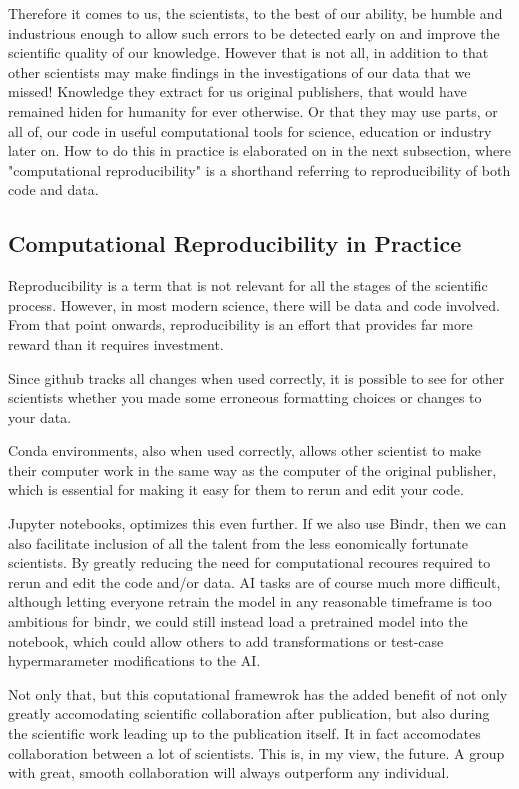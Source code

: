\documentclass[nofootinbib,UKenglish,nobalancelastpage,12pt]{article}
\begin{document}
Therefore it comes to us, the scientists, to the best of our ability, be humble and industrious enough to allow such errors to be detected early on and improve the scientific quality of our knowledge. However that is not all, in addition to that other scientists may make findings in the investigations of our data that we missed! Knowledge they extract for us original publishers, that would have remained hiden for humanity for ever otherwise. Or that they may use parts, or all of, our code in useful computational tools for science, education or industry later on. How to do this in practice is elaborated on in the next subsection, where "computational reproducibility" is a shorthand referring to reproducibility of both code and data.

\subsection{Computational Reproducibility in Practice}

Reproducibility is a term that is not relevant for all the stages of the scientific process. However, in most modern science, there will be data and code involved. From that point onwards, reproducibility is an effort that provides far more reward than it requires investment. 

Since github tracks all changes when used correctly, it is possible to see for other scientists whether you made some erroneous formatting choices or changes to your data. 

Conda environments, also when used correctly, allows other scientist to make their computer work in the same way as the computer of the original publisher, which is essential for making it easy for them to rerun and edit your code.

Jupyter notebooks, optimizes this even further. If we also use Bindr, then we can also facilitate inclusion of all the talent from the less eonomically fortunate scientists. By greatly reducing the need for computational recoures required to rerun and edit the code and/or data. AI tasks are of course much more difficult, although letting everyone retrain the model in any reasonable timeframe is too ambitious for bindr, we could still instead load a pretrained model into the notebook, which could allow others to add transformations or test-case hypermarameter modifications to the AI.

Not only that, but this coputational framewrok has the added benefit of not only greatly accomodating scientific collaboration after publication, but also during the scientific work leading up to the publication itself. It in fact accomodates collaboration between a lot of scientists. This is, in my view, the future. A group with great, smooth collaboration will always outperform any individual.
\clearpage
\end{document}
